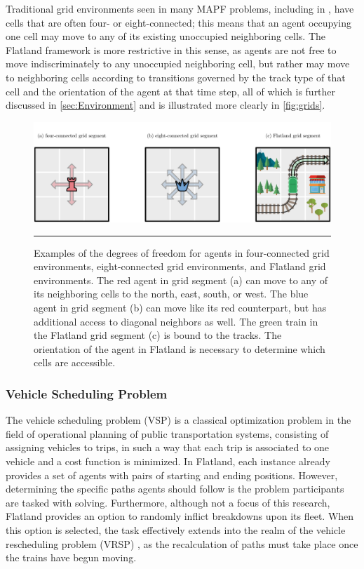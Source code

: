 \documentclass[11pt]{article}
\begin{document}
Traditional grid environments seen in many MAPF problems, including in \citep{standley10a}, have cells that are often four- or eight-connected; this means that an agent occupying one cell may move to any of its existing unoccupied neighboring cells.  The Flatland framework is more restrictive in this sense, as agents are not free to move indiscriminately to any unoccupied neighboring cell, but rather may move to neighboring cells according to transitions governed by the track type of that cell and the orientation of the agent at that time step, all of which is further discussed in \autoref{sec:Environment} and is illustrated more clearly in \autoref{fig:grids}.

\begin{figure}[t]
\centering
\includegraphics[width=\textwidth]{chess2}
\caption{Examples of the degrees of freedom for agents in four-connected grid environments, eight-connected grid environments, and Flatland grid environments. The red agent in grid segment (a) can move to any of its neighboring cells to the north, east, south, or west.  The blue agent in grid segment (b) can move like its red counterpart, but has additional access to diagonal neighbors as well.  The green train in the Flatland grid segment (c) is bound to the tracks.  The orientation of the agent in Flatland is necessary to determine which cells are accessible. }
\label{fig:grids}

\begin{center}
{\color{lightgray} \rule{\linewidth}{0.15mm}}
\end{center}

\end{figure}

\subsubsection{Vehicle Scheduling Problem}
The vehicle scheduling problem (VSP) \citep{bapeukfa00a} is a classical optimization problem in the field of operational planning of public transportation systems, consisting of assigning vehicles to trips, in such a way that each trip is associated to one vehicle and a cost function is minimized.  In Flatland, each instance already provides a set of agents with pairs of starting and ending positions.  However, determining the specific paths agents should follow is the problem participants are tasked with solving.  Furthermore, although not a focus of this research, Flatland provides an option to randomly inflict breakdowns upon its fleet.  When this option is selected, the task effectively extends into the realm of the vehicle rescheduling problem (VRSP) \citep{limibo07a}, as the recalculation of paths must take place once the trains have begun moving.
\end{document}

